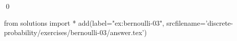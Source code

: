 
\begin{ex} 
  \label{ex:bernoulli-03}
  
  \qed
\end{ex} 
\begin{python0}
from solutions import *
add(label="ex:bernoulli-03",
    srcfilename='discrete-probability/exercises/bernoulli-03/answer.tex') 
\end{python0}
